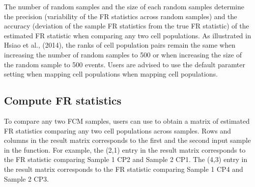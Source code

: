 \documentclass[12pt]{article}\usepackage[]{graphicx}\usepackage[usenames,dvipsnames]{color}
\begin{document}
The number of random samples and the size of each random samples determine the precision (variability of the FR statistics across random samples) and the accuracy (deviation of the sample FR statistics from the true FR statistic) of the estimated FR statistic when comparing any two cell populations. As illustrated in Hsiao et al., (2014), the ranks of cell population pairs remain the same when increasing the number of random samples to 500 or when increasing the size of the random sample to 500 events. Users are advised to use the default paramter setting when mapping cell populations when mapping cell populations.\\ 



\subsection{Compute FR statistics}
To compare any two FCM samples, users can use  to obtain a matrix of estimated FR statistics comparing any two cell populations across samples. Rows and columns in the result matrix corresponds to the first and the second input sample in the  function. For example, the (2,1) entry in the result matrix corresponds to the FR statistic comparing Sample 1 CP2 and Sample 2 CP1. The (4,3) entry in the result matrix corresponds to the FR statistic comparing Sample 1 CP4 and Sample 2 CP3.
\end{document}
